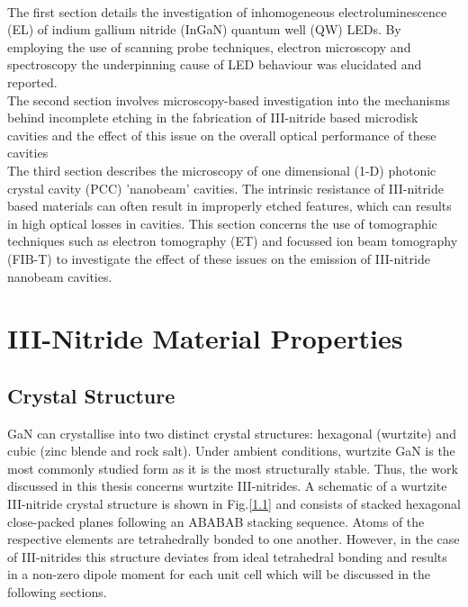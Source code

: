 \\The first section details the investigation of inhomogeneous electroluminescence  (EL) of indium gallium nitride (InGaN) quantum well (QW) LEDs. By employing the use of scanning probe techniques, electron microscopy and spectroscopy the underpinning cause of LED behaviour was elucidated and reported.
\\The second section involves microscopy-based investigation into the mechanisms behind incomplete etching in the fabrication of III-nitride based microdisk cavities and the effect of this issue on the overall optical performance of these cavities
\\The third section describes the microscopy of one dimensional  (1-D) photonic crystal cavity (PCC) 'nanobeam' cavities. The intrinsic resistance of III-nitride based materials can often result in improperly etched features, which can results in high optical losses in cavities. This section concerns the use of tomographic techniques such as electron tomography  (ET) and focussed ion beam tomography  (FIB-T) to investigate the effect of these issues on the emission of III-nitride nanobeam cavities. 

\section{III-Nitride Material Properties } %

\subsection{Crystal Structure}
\label{section1.1.1}

GaN can crystallise into two distinct crystal structures: hexagonal (wurtzite) and cubic (zinc blende and rock salt). Under ambient conditions, wurtzite GaN is the most commonly studied form as it is the most structurally stable. Thus, the work discussed in this thesis concerns wurtzite III-nitrides. A schematic of a wurtzite III-nitride crystal structure is shown in Fig.\ref{1.1} and consists of stacked hexagonal close-packed planes following an ABABAB stacking sequence. Atoms of the respective elements are tetrahedrally bonded to one another. However, in the case of III-nitrides this structure deviates from ideal tetrahedral bonding and results in a non-zero dipole moment for each unit cell which will be discussed in the following sections.

